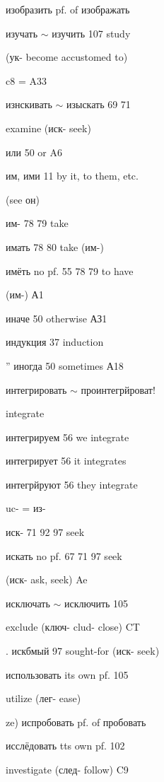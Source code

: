 \begin{minipage}[t]{0.475\textwidth}
\raggedright
\noindent изобразить pf. of изображать\par
\noindent изучать $\sim$ изучить 107 study\par
\noindent (ук- become accustomed to)\par
\noindent c8 = A33\par
\noindent изнскивать $\sim$ изыскать 69 71\par
\noindent examine (иск- seek)\par
\noindent или 50 or A6\par
\noindent им, ими 11 by it, to them, etc.\par
\noindent (see он)\par
\noindent им- 78 79 take\par
\noindent *имать 78 80 take (им-)\par
\noindent имёть no pf. 55 78 79 to have\par
\noindent (им-) А1\par
\noindent иначе 50 otherwise АЗ1\par
\noindent индукция 37 induction\par
\noindent ” иногда 50 sometimes А18\par
\noindent интегрировать $\sim$ проинтегрйроват!\par
{} integrate\par
\noindent интегрируем 56 we integrate\par
\noindent интегрирует 56 it integrates\par
\noindent интегрйруют 56 they integrate\par
\noindent uc- = из-\par
\noindent иск- 71 92 97 seek\par
\noindent искать no pf. 67 71 97 seek\par
\noindent (иск- ask, seek) Ae\par
\noindent исключать $\sim$ исключить 105\par
\noindent exclude (ключ- clud- close) CT\par
\noindent . искбмый 97 sought-for (иск- seek)\par
\noindent использовать its own pf. 105\par
\noindent utilize (лег- ease)\par
\noindent ze) испробовать pf. of пробовать\par
\noindent исслёдовать tts own pf. 102\par
\noindent investigate (след- follow) C9\par

\end{minipage}
